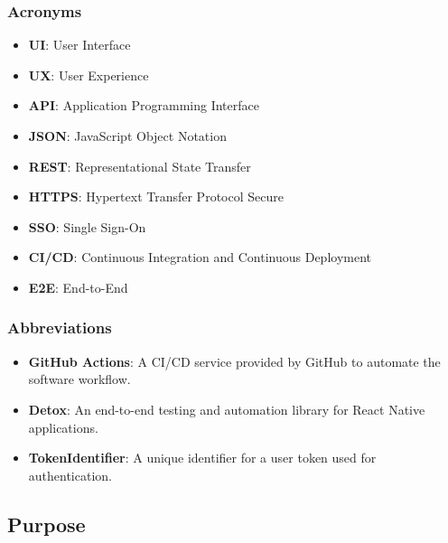 \subsubsection{Acronyms}

\begin{itemize}
    \item \textbf{UI}: User Interface
    \item \textbf{UX}: User Experience
    \item \textbf{API}: Application Programming Interface
    \item \textbf{JSON}: JavaScript Object Notation
    \item \textbf{REST}: Representational State Transfer
    \item \textbf{HTTPS}: Hypertext Transfer Protocol Secure
    \item \textbf{SSO}: Single Sign-On
    \item \textbf{CI/CD}: Continuous Integration and Continuous Deployment
    \item \textbf{E2E}: End-to-End
\end{itemize}

\subsubsection{Abbreviations}

\begin{itemize}
    \item \textbf{GitHub Actions}: A CI/CD service provided by GitHub to automate the software workflow.
    \item \textbf{Detox}: An end-to-end testing and automation library for React Native applications.
    \item \textbf{TokenIdentifier}: A unique identifier for a user token used for authentication.
\end{itemize}


\subsection{Purpose}

